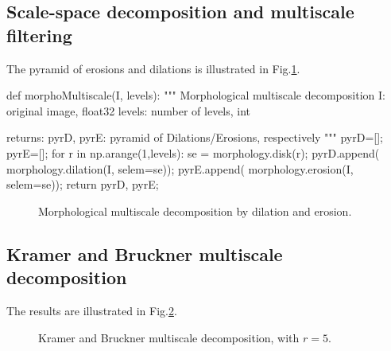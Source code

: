 \subsection{Scale-space decomposition and multiscale filtering}
The pyramid of erosions and dilations is illustrated in Fig.\ref{fig:multiscale:python:erodil}.
\begin{python}
def morphoMultiscale(I, levels):
    """
    Morphological multiscale decomposition
    I: original image, float32
    levels: number of levels, int
    
    returns: pyrD, pyrE: pyramid of Dilations/Erosions, respectively
    """
    pyrD=[];
    pyrE=[];
    for r in np.arange(1,levels):
        se = morphology.disk(r);
        pyrD.append( morphology.dilation(I, selem=se));
        pyrE.append( morphology.erosion(I, selem=se));
    return pyrD, pyrE;
\end{python}


\begin{figure}[htbp]
\centering\caption{Morphological multiscale decomposition by dilation and erosion.}%
 \hfill
 \hfill
 
 \hfill
 \hfill
 \label{fig:multiscale:python:erodil}%
\end{figure}

\subsection{Kramer and Bruckner multiscale decomposition}
The results are illustrated in Fig.\ref{fig:multiscale:python:KB}.

\begin{figure}[htbp]
\centering\caption{Kramer and Bruckner multiscale decomposition, with $r=5$.}%
 \hfill
 \hfill
 \label{fig:multiscale:python:KB}%
\end{figure}

